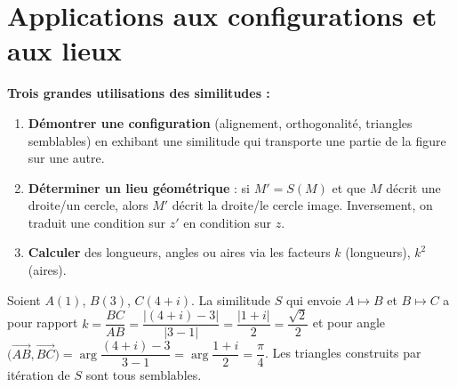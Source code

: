 \section{Applications aux configurations et aux lieux}

\begin{aretenir}
\textbf{Trois grandes utilisations des similitudes :}
\begin{enumerate}[label=\arabic*)]
\item \textbf{Démontrer une configuration} (alignement, orthogonalité, triangles semblables) en exhibant
une similitude qui transporte une partie de la figure sur une autre.
\item \textbf{Déterminer un lieu géométrique} : si $M'=S(M)$ et que $M$ décrit une droite/un cercle, alors
$M'$ décrit la droite/le cercle image. Inversement, on traduit une condition sur $z'$ en condition sur $z$.
\item \textbf{Calculer} des longueurs, angles ou aires via les facteurs $k$ (longueurs), $k^2$ (aires).
\end{enumerate}
\end{aretenir}

\begin{exemple}
Soient $A(1)$, $B(3)$, $C(4+i)$. La similitude $S$ qui envoie $A\mapsto B$ et $B\mapsto C$ a pour rapport
$k=\dfrac{BC}{AB}=\dfrac{|(4+i)-3|}{|3-1|}=\dfrac{|1+i|}{2}=\dfrac{\sqrt2}{2}$ et pour angle
$\big(\overrightarrow{AB},\overrightarrow{BC}\big)=\arg\dfrac{(4+i)-3}{3-1}=\arg\dfrac{1+i}{2}=\dfrac\pi4$.
Les triangles construits par itération de $S$ sont tous semblables.
\end{exemple}

\begin{illus}
\end{illus}

